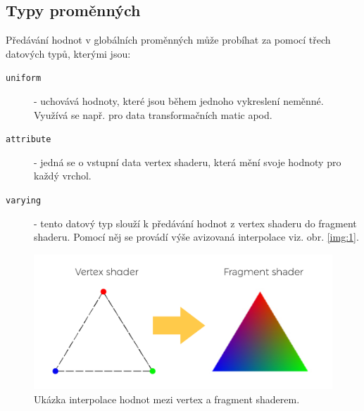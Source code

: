 \newpage


\subsection{Typy proměnných}
Předávání hodnot v globálních proměnných může probíhat za pomocí třech datových typů, kterými jsou:
\begin{description}
	\item[\texttt{uniform}]  
	- uchovává hodnoty, které jsou během jednoho vykreslení neměnné. Využívá se např. pro data transformačních matic apod.	
	
	\item[\texttt{attribute}] 
	- 	jedná se o vstupní data vertex shaderu, která mění svoje hodnoty pro každý vrchol. 
	
	\item[\texttt{varying}] 
	- tento datový typ slouží k předávání hodnot z vertex shaderu do fragment shaderu. Pomocí něj se provádí výše avizovaná interpolace viz. obr. \ref{img:1}.

\end{description}


 
\begin{figure}[h]
	\label{img:1}
	\centering
	\includegraphics[scale=1.0,angle=0,width=1.0\linewidth]{obrazky-figures/interpolace}
	\caption{Ukázka interpolace hodnot mezi vertex a fragment shaderem.}
	\label{fig:inter}
\end{figure}
 



\newpage

